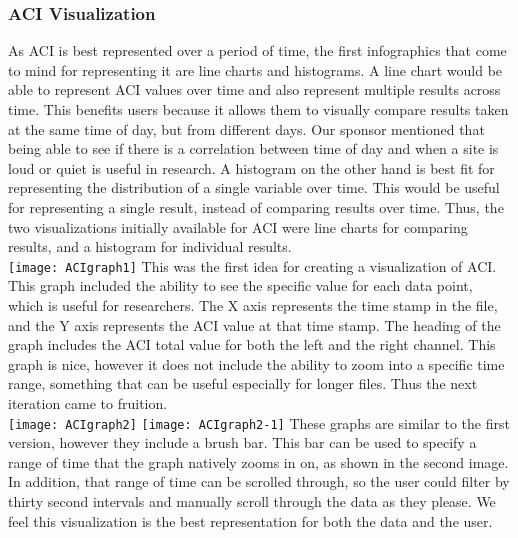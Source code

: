 \subsubsection{ACI Visualization}
As ACI is best represented over a period of time, the first infographics that come to mind for representing it are line charts and histograms. A line chart would be able to represent ACI values over time and also represent multiple results across time. This benefits users because it allows them to visually compare results taken at the same time of day, but from different days. Our sponsor mentioned that being able to see if there is a correlation between time of day and when a site is loud or quiet is useful in research. A histogram on the other hand is best fit for representing the distribution of a single variable over time. This would be useful for representing a single result, instead of comparing results over time. Thus, the two visualizations initially available for ACI were line charts for comparing results, and a histogram for individual results.\\

\texttt{[image: ACIgraph1]}
This was the first idea for creating a visualization of ACI. This graph included the ability to see the specific value for each data point, which is useful for researchers. The X axis represents the time stamp in the file, and the Y axis represents the ACI value at that time stamp. The heading of the graph includes the ACI total value for both the left and the right channel. This graph is nice, however it does not include the ability to zoom into a specific time range, something that can be useful especially for longer files. Thus the next iteration came to fruition.\\

\texttt{[image: ACIgraph2]}
\texttt{[image: ACIgraph2-1]}
These graphs are similar to the first version, however they include a brush bar. This bar can be used to specify a range of time that the graph natively zooms in on, as shown in the second image. In addition, that range of time can be scrolled through, so the user could filter by thirty second intervals and manually scroll through the data as they please. We feel this visualization is the best representation for both the data and the user.\\
